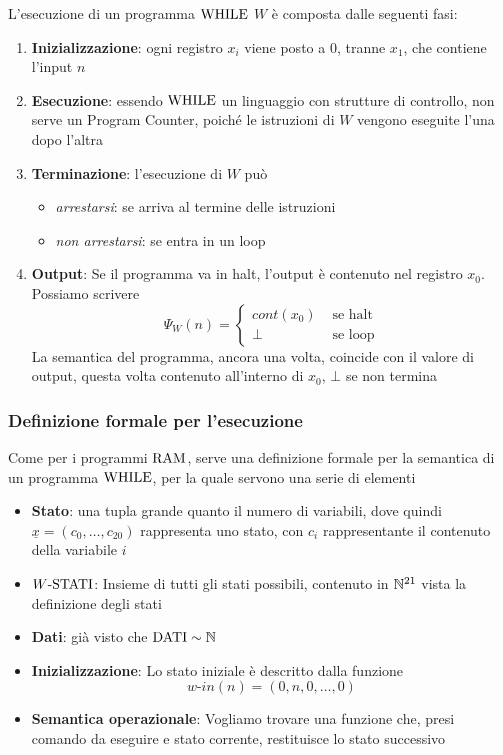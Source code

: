 L'esecuzione di un programma $\text{WHILE}$ $W$ è composta dalle seguenti fasi: 
\begin{enumerate}
	\item \textbf{Inizializzazione}: ogni registro $x_i$ viene posto a $0$, tranne $x_1$, che contiene l'input $n$
    
	\item \textbf{Esecuzione}: essendo $\text{WHILE}$ un linguaggio con strutture di controllo, non serve un Program Counter, poiché le istruzioni di $W$ vengono eseguite l'una dopo l'altra
	
    \item \textbf{Terminazione}: l'esecuzione di $W$ può 
	\begin{itemize}
		\item \textit{arrestarsi}: se arriva al termine delle istruzioni
	
    	\item \textit{non arrestarsi}: se entra in un loop
	\end{itemize}
	
    \item \textbf{Output}: Se il programma va in halt, l'output è contenuto nel registro $x_0$. Possiamo scrivere
	$$ \Psi_W (n) = \begin{cases}
		cont(x_0) & \text{ se halt} \\
		\bot & \text{ se loop}
	\end{cases}$$
    La semantica del programma, ancora una volta, coincide con il valore di output, questa volta contenuto all'interno di $x_0$, $\bot$ se non termina
\end{enumerate}

\subsubsection{Definizione formale per l'esecuzione}

Come per i programmi $\text{RAM}$, serve una definizione formale per la semantica di un programma $\text{WHILE}$, per la quale servono una serie di elementi
\begin{itemize}
	\item \textbf{Stato}: una tupla grande quanto il numero di variabili, dove quindi $\underline{x} = (c_0, \dots, c_{20})$ rappresenta uno stato, con $c_i$ rappresentante il contenuto della variabile $i$
	
    \item \textbf{$W\text{-STATI}$}: Insieme di tutti gli stati possibili, contenuto in $\mathbb{N}^{21}$ vista la definizione degli stati 
	
    \item \textbf{Dati}: già visto che $\text{DATI} \sim \mathbb{N}$
	
    \item \textbf{Inizializzazione}: Lo stato iniziale è descritto dalla funzione 
	$$ w\text{-}in(n) = (0, n, 0, \dots, 0) $$
	
    \item \textbf{Semantica operazionale}: Vogliamo trovare una funzione che, presi comando da eseguire e stato corrente, restituisce lo stato successivo
\end{itemize}


